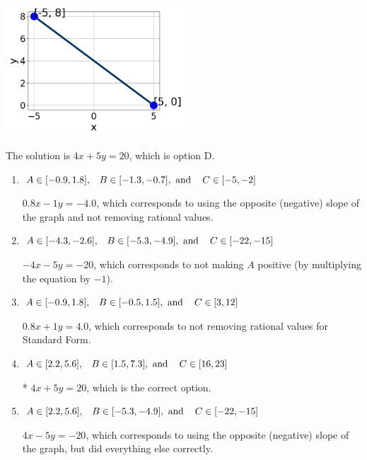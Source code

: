 \documentclass{extbook}[14pt]
\begin{document}
\begin{enumerate}
{\begin{center}
    \includegraphics[width=0.5\textwidth]{../Figures/linearGraphToStandardCopyA.png}
\end{center}




The solution is \( 4x + 5y = 20 \), which is option D.\begin{enumerate}[label=\Alph*.]
\item \( A \in [-0.9, 1.8], \hspace{3mm} B \in [-1.3, -0.7], \text{ and } \hspace{3mm} C \in [-5, -2] \)

 $0.8x - 1y = -4.0$, which corresponds to using the opposite (negative) slope of the graph and not removing rational values.
\item \( A \in [-4.3, -2.6], \hspace{3mm} B \in [-5.3, -4.9], \text{ and } \hspace{3mm} C \in [-22, -15] \)

 $-4x - 5y = -20$, which corresponds to not making $A$ positive (by multiplying the equation by $-1$).
\item \( A \in [-0.9, 1.8], \hspace{3mm} B \in [-0.5, 1.5], \text{ and } \hspace{3mm} C \in [3, 12] \)

 $0.8x + 1y = 4.0$, which corresponds to not removing rational values for Standard Form.
\item \( A \in [2.2, 5.6], \hspace{3mm} B \in [1.5, 7.3], \text{ and } \hspace{3mm} C \in [16, 23] \)

* $4x + 5y = 20$, which is the correct option.
\item \( A \in [2.2, 5.6], \hspace{3mm} B \in [-5.3, -4.9], \text{ and } \hspace{3mm} C \in [-22, -15] \)

 $4x - 5y = -20$, which corresponds to using the opposite (negative) slope of the graph, but did everything else correctly.
\end{enumerate}

}
\end{enumerate}
\end{document}
